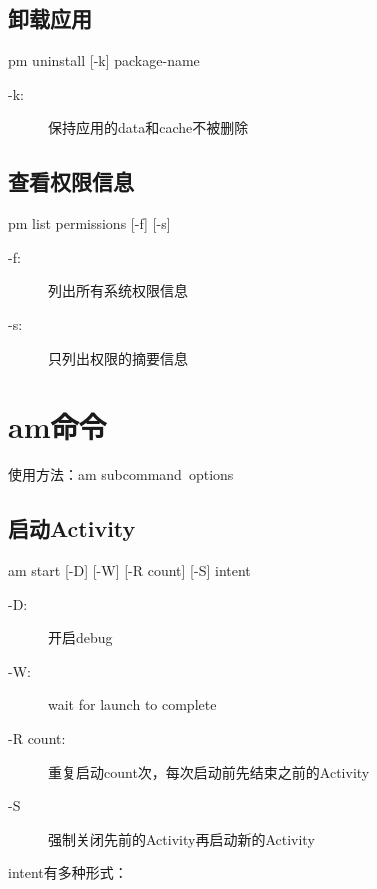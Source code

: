 ﻿\documentclass[a4paper,11pt]{article}
\begin{document}
  \subsection[卸载应用]{卸载应用}
  pm uninstall [-k] \lt package-name\gt

  \begin{description}
    \item[-k:] 保持应用的data和cache不被删除
  \end{description}

  \subsection[查看权限信息]{查看权限信息}
  pm list permissions [-f] [-s]

  \begin{description}
    \item[-f:] 列出所有系统权限信息
    \item[-s:] 只列出权限的摘要信息
  \end{description}


  \section[am - Application Manager]{am命令}
  使用方法：am \lt subcommand\gt\ \lt options\gt

  \subsection[启动Activity]{启动Activity}
  am start [-D] [-W] [-R \lt count\gt] [-S] \lt intent\gt

  \begin{description}
    \item[-D:] 开启debug
    \item[-W:] wait for launch to complete
    \item[-R \lt count\gt:] 重复启动count次，每次启动前先结束之前的Activity
    \item[-S] 强制关闭先前的Activity再启动新的Activity
  \end{description}

  \lt intent\gt 有多种形式：
\end{document}
